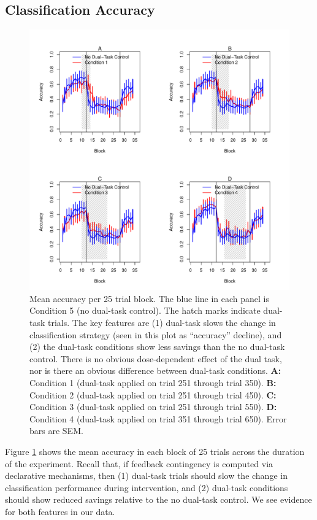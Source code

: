 \subsection*{Classification Accuracy} 
\begin{figure}[t]
  \centering \includegraphics[width=1.0\textwidth]{../figures/fig_learning_curves.pdf}
  \caption{
    Mean accuracy per 25 trial block. The blue line in each panel is Condition
    5 (no dual-task control). The hatch marks indicate dual-task trials. The key
    features are (1) dual-task slows the change in classification strategy (seen
    in this plot as ``accuracy'' decline), and (2) the dual-task conditions show
    less savings than the no dual-task control. There is no obvious 
    dose-dependent effect of the dual task, nor is there an obvious difference
    between dual-task conditions.
    \textbf{A:} Condition 1 (dual-task applied on trial 251 through trial 350).
    \textbf{B:} Condition 2 (dual-task applied on trial 251 through trial 450). 
    \textbf{C:} Condition 3 (dual-task applied on trial 251 through trial 550). 
    \textbf{D:} Condition 4 (dual-task applied on trial 351 through trial 650). 
    Error bars are SEM.
  }
  \label{fig:learning_curves}
\end{figure}

Figure \ref{fig:learning_curves} shows the mean accuracy in each block of 25
trials across the duration of the experiment. Recall that, if feedback
contingency is computed via declarative mechanisms, then (1) dual-task trials
should slow the change in classification performance during intervention, and (2)
dual-task conditions should show reduced savings relative to the no dual-task
control. We see evidence for both features in our data.

